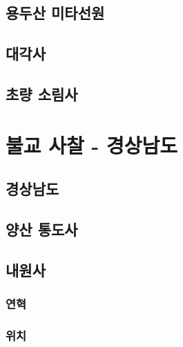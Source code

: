 \documentclass[12pt, a4paper, oneside]{book}
\let\stdsection\section
\renewcommand\section{\newpage\stdsection}
\begin{document}
	\chapter{용두산 미타선원}



	\chapter{대각사}

	\chapter{초량 소림사}









	\part{불교 사찰 - 경상남도}
	\noptcrule
	\parttoc				


	\chapter{경상남도}



	\chapter{양산 통도사}


	\chapter{내원사}
	\minitoc


		\section{연혁}

		\section{위치}
\end{document}
